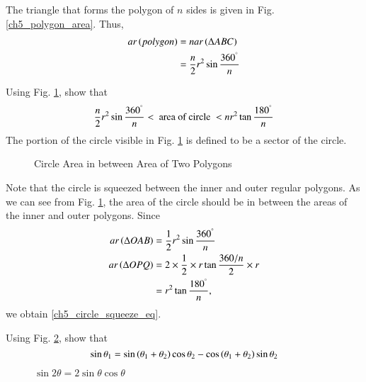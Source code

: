 \proof The triangle that forms the polygon of $n$ sides is given in Fig. \ref{ch5_polygon_area}.  Thus,
%
\begin{equation}
\begin{split}
ar\left(polygon\right) &= n ar\left(\Delta ABC\right) \\
&= \frac{n}{2}r^{2}\sin\frac{360^{\degree}}{n}
\end{split}
\end{equation}
%
\begin{problem}
	Using Fig. \ref{ch5_circle_squeeze}, show that
%
\begin{equation}
\label{ch5_circle_squeeze_eq}
\frac{n}{2}r^{2}\sin\frac{360^{\degree}}{n} < \text{ area of circle } < nr^{2}\tan\frac{180^{\degree}}{n}
\end{equation}
%
The portion of the circle visible in Fig. \ref{ch5_circle_squeeze} is defined to be a sector of the circle.
\end{problem}
\begin{figure}[!h]
	\begin{center}
		
		\resizebox{\columnwidth}{!}{}
	\end{center}
	\caption{Circle Area in between Area of Two Polygons}
	\label{ch5_circle_squeeze}	
\end{figure}
%

\proof Note that the circle is squeezed between the inner and outer regular polygons.  As we can see from Fig. \ref{ch5_circle_squeeze}, the area of the circle should be in between the areas of the inner and outer polygons.  Since
%
\begin{align}
ar \left(\Delta OAB\right) &= \frac{1}{2}r^{2}\sin\frac{360^{\degree}}{n} \\
ar \left(\Delta OPQ\right) &= 2 \times \frac{1}{2} \times r \tan\frac{360/n}{2} \times r \\
&= r^{2}\tan\frac{180^{\degree}}{n},
\end{align}
%
we obtain \eqref{ch5_circle_squeeze_eq}.
%
%
\begin{problem}
	Using Fig. \ref{ch5_sin_theta}, show that 
\begin{equation}
\label{ch5_sin_theta_eq}
\sin  \theta_1 = \sin \left(\theta_1 + \theta_2\right)\cos \theta_2 - \cos\left(\theta_1+\theta_2\right)\sin\theta_2
\end{equation}	
\end{problem}
\begin{figure}[!h]
	\begin{center}
		
		\resizebox{\columnwidth}{!}{}
	\end{center}
	\caption{$\sin2\theta = 2\sin\theta\cos\theta$}
	\label{ch5_sin_theta}	
\end{figure}
%

